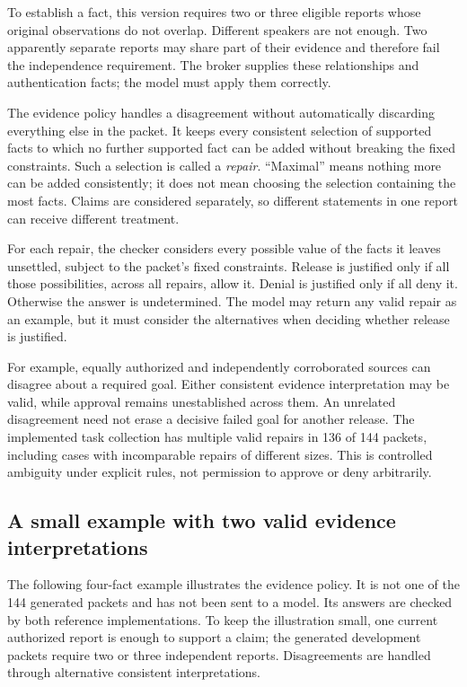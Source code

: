 \documentclass[a4paper,preprint,12pt,numbers,nopreprintline]{elsarticle}
\begin{document}
To establish a fact, this version requires two or three eligible reports whose original observations do not overlap. Different speakers are not enough. Two apparently separate reports may share part of their evidence and therefore fail the independence requirement. The broker supplies these relationships and authentication facts; the model must apply them correctly.

The evidence policy handles a disagreement without automatically discarding everything else in the packet. It keeps every consistent selection of supported facts to which no further supported fact can be added without breaking the fixed constraints. Such a selection is called a \emph{repair}. ``Maximal'' means nothing more can be added consistently; it does not mean choosing the selection containing the most facts. Claims are considered separately, so different statements in one report can receive different treatment.

For each repair, the checker considers every possible value of the facts it leaves unsettled, subject to the packet's fixed constraints. Release is justified only if all those possibilities, across all repairs, allow it. Denial is justified only if all deny it. Otherwise the answer is undetermined. The model may return any valid repair as an example, but it must consider the alternatives when deciding whether release is justified.

For example, equally authorized and independently corroborated sources can disagree about a required goal. Either consistent evidence interpretation may be valid, while approval remains unestablished across them. An unrelated disagreement need not erase a decisive failed goal for another release. The implemented task collection has multiple valid repairs in 136 of 144 packets, including cases with incomparable repairs of different sizes. This is controlled ambiguity under explicit rules, not permission to approve or deny arbitrarily.

\subsection{A small example with two valid evidence interpretations}\label{sec:epistemic-grey-example}
The following four-fact example illustrates the evidence policy. It is not one of the 144 generated packets and has not been sent to a model. Its answers are checked by both reference implementations. To keep the illustration small, one current authorized report is enough to support a claim; the generated development packets require two or three independent reports. Disagreements are handled through alternative consistent interpretations.
\end{document}
